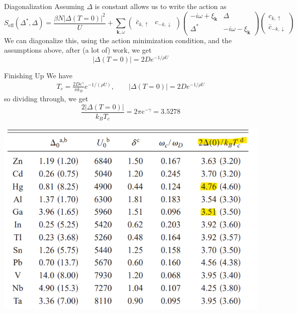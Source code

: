 \documentclass[aspectratio=169,xcolor=dvipsnames]{beamer}
\begin{document}
\begin{frame}{Diagonalization}
    Assuming $\Delta$ is constant allows us to write the action as 
    \begin{equation*}
        S_\text{eff}(\Delta^*,\Delta) = \frac{\beta N|\Delta(T=0)|^2}{U} + \sum_{\bm{k},\omega} \begin{pmatrix}\bar{c}_{k,\uparrow} & c_{-k,\downarrow}
        \end{pmatrix}\begin{pmatrix}
            -i\omega + \xi_{\bm{k}} & \Delta \\ 
            \Delta^* & -i\omega - \xi_{\bm{k}}
        \end{pmatrix}\begin{pmatrix}
            c_{k,\uparrow} \\ \bar{c}_{-k,\downarrow}
        \end{pmatrix}
    \end{equation*}
    We can diagonalize this, using the action minimization condition, and the assumptions above, after (a lot of) work, we get 
    \begin{equation*}
        |\Delta(T=0)| = 2De^{-1/\rho U}
    \end{equation*}
\end{frame}
\begin{frame}{Finishing Up}
    We have 
    \begin{align*}
        T_c = \frac{2De^\gamma}{\pi k_B}e^{-1/(\rho U)},\qquad |\Delta(T=0)| = 2De^{-1/\rho U}
    \end{align*}
    so dividing through, we get 
    \begin{equation*}
        \frac{2|\Delta(T=0)|}{k_BT_c} = 2\pi e^{-\gamma} = 3.5278
    \end{equation*}
    \begin{center}
        \includegraphics[width=0.5\linewidth]{fig/table.png}
    \end{center}
\end{frame}
\end{document}
